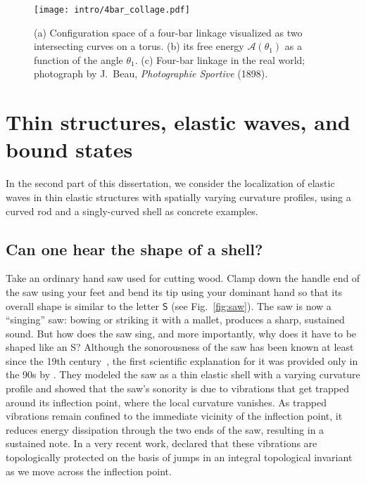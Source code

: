 \begin{figure}
  \begin{center}
    \texttt{[image: intro/4bar\_collage.pdf]}
  \end{center}
\caption{(a) Configuration space of a four-bar linkage visualized as two intersecting curves on a torus. (b) its free energy $\mathscr{A}(\theta_{1})$ as a function of the angle $\theta_{1}$. (c) Four-bar linkage in the real world; photograph by J.~Beau, \emph{Photographie Sportive} (1898).}
  \label{fig:4bar_collage}
\end{figure}

\section{Thin structures, elastic waves, and bound states}

In the second part of this dissertation, we consider the localization of elastic waves in thin elastic structures with spatially varying curvature profiles, using a curved rod and a singly-curved shell as concrete examples.

\subsection{Can one hear the shape of a shell?}

Take an ordinary hand saw used for cutting wood.
Clamp down the handle end of the saw using your feet and bend its tip using your dominant hand so that its overall shape is similar to the letter $\mathsf{S}$ (see Fig.~\ref{fig:saw}).
The saw is now a ``singing'' saw: bowing or striking it with a mallet, produces a sharp, sustained sound.
But how does the saw sing, and more importantly, why does it have to be shaped like an \textsf{S}?
Although the sonorousness of the saw has been known at least since the 19th century~\cite{stuckenbruck2016}, the first scientific explanation for it was provided only in the 90s by \citet{scott1992}.
They modeled the saw as a thin elastic shell with a varying curvature profile and showed that the saw's sonority is due to vibrations that get trapped around its inflection point, where the local curvature vanishes.
As trapped vibrations remain confined to the immediate vicinity of the inflection point, it reduces energy dissipation through the two ends of the saw, resulting in a sustained note.
In a very recent work, \citet{shankar2022} declared that these vibrations are topologically protected on the basis of jumps in an integral topological invariant as we move across the inflection point.

